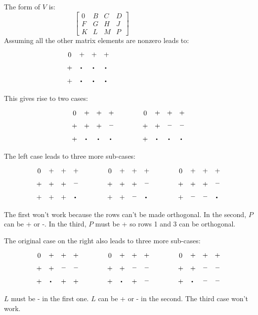 The form of $V$ is:
\begin{equation*}
\begin{bmatrix}
0 & B & C & D \\
F & G & H & J \\
K & L & M & P
\end{bmatrix}
~~~~~~~~~~~~~~~~~~~~~~~~~~~~~~~~~~~
\end{equation*}
Assuming all the other matrix elements are nonzero leads to:
\begin{equation*}
\myarrset
\begin{array}{cccc}
\ndcz & \ndcp & \ndcp & \ndcp \\
\ndcp & \ndcd & \ndsd & \ndcd \\
\ndsp & \ndcd & \ndcd & \ndsd
\end{array}
~~~~~~~~~~~~~~~~~~~~~~~~~~~~~~~~~~~
\end{equation*}
This gives rise to two cases:
\begin{equation*}
\myarrset
\begin{array}{ccccccccc}
\ndcz & \ndcp & \ndcp & \ndcp & ~~~~~~~~~ & \ndcz & \ndcp & \ndcp & \ndcp \\
\ndcp & \ndcp & \ndcp & \ndcm & ~~~~~~~~~ & \ndcp & \ndcp & \ndcm & \ndcm \\
\ndcp & \ndcd & \ndcd & \ndcd & ~~~~~~~~~ & \ndcp & \ndcd & \ndcd & \ndcd
\end{array}
\end{equation*}
The left case leads to three more sub-cases:
\begin{equation*}
\myarrset
\begin{array}{cccccccccccccc}
\ndcz & \ndcp & \ndcp & \ndcp & ~~~~~~~~~ & \ndcz & \ndcp & \ndcp & \ndcp & ~~~~~~~~~ & \ndcz & \ndcp & \ndcp & \ndcp \\
\ndcp & \ndcp & \ndcp & \ndcm & ~~~~~~~~~ & \ndcp & \ndcp & \ndcp & \ndcm & ~~~~~~~~~ & \ndcp & \ndcp & \ndcp & \ndcm \\
\ndcp & \ndcp & \ndcp & \ndcd & ~~~~~~~~~ & \ndcp & \ndcp & \ndcm & \ndcd & ~~~~~~~~~ & \ndcp & \ndcm & \ndcm & \ndcd
\end{array}
\end{equation*}
The first won't work because the rows can't be made orthogonal.  In the
second, $P$ can be + or -.  In the third, $P$ must be + so rows 1 and 3 can be
orthogonal.

The original case on the right also leads to three more sub-cases:
\begin{equation*}
\myarrset
\begin{array}{cccccccccccccc}
\ndcz & \ndcp & \ndcp & \ndcp & ~~~~~~~~~ & \ndcz & \ndcp & \ndcp & \ndcp & ~~~~~~~~~ & \ndcz & \ndcp & \ndcp & \ndcp \\
\ndcp & \ndcp & \ndcm & \ndcm & ~~~~~~~~~ & \ndcp & \ndcp & \ndcm & \ndcm & ~~~~~~~~~ & \ndcp & \ndcp & \ndcm & \ndcm \\
\ndcp & \ndcd & \ndcp & \ndcp & ~~~~~~~~~ & \ndcp & \ndcd & \ndcp & \ndcm & ~~~~~~~~~ & \ndcp & \ndcd & \ndcm & \ndcm
\end{array}
\end{equation*}
$L$ must be - in the first one.  $L$ can be + or - in the second.  The third
case won't work.

